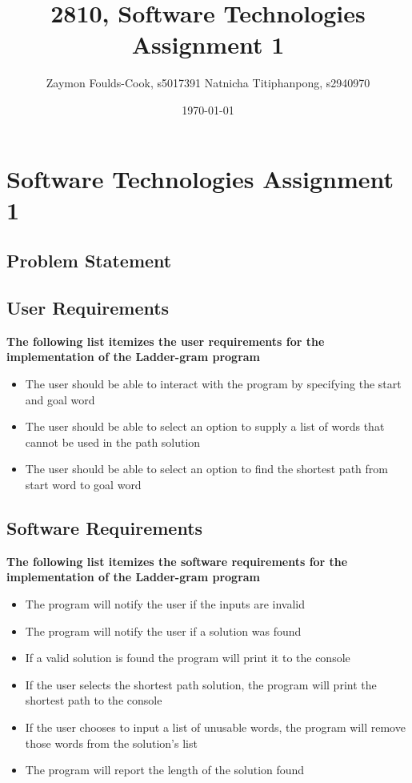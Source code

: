 \documentclass[12pt, a4]{report}
\title{2810, Software Technologies Assignment 1}
\author{Zaymon Foulds-Cook, s5017391 \textbar{} Natnicha Titiphanpong, s2940970}%
\date{\today}
\begin{document}
\begin{titlepage}
	\maketitle
\end{titlepage}
 \tableofcontents
\pagebreak
\section{Software Technologies Assignment 1}
\subsection{Problem Statement}
	\par 
	
\subsection{User Requirements}
	\textbf{The following list itemizes the user requirements for the implementation of the Ladder-gram program}
	\begin{itemize}
		\item The user should be able to interact with the program by specifying the start and goal word
		\item The user should be able to select an option to supply a list of words that cannot be used in the path solution
		\item The user should be able to select an option to find the shortest path from start word to goal word
	\end{itemize}
	
\subsection{Software Requirements}
	\textbf{The following list itemizes the software requirements for the implementation of the Ladder-gram program}
	\begin{itemize}
		\item The program will notify the user if the inputs are invalid
		\item The program will notify the user if a solution was found
		\item If a valid solution is found the program will print it to the console
		\item If the user selects the shortest path solution, the program will print the shortest path to the console
		\item If the user chooses to input a list of unusable words, the program will remove those words from the solution's list
		\item The program will report the length of the solution found 
	\end{itemize}
	\pagebreak
	
\end{document}

